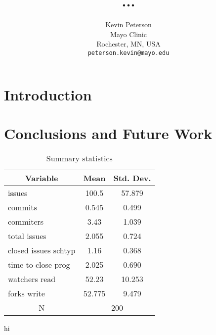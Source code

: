 \documentclass[12pt]{proc}
\title{...}
\author{Kevin Peterson\\
\small Mayo Clinic\\
\small Rochester, MN, USA\\
\small \texttt{peterson.kevin@mayo.edu}\\
}
\begin{document}
\maketitle

\begin{abstract}

\end{abstract}

\section{Introduction}


\section{Conclusions and Future Work}

\begin{table}[htbp]\centering \caption{Summary statistics \label{sumstat}}
\begin{tabular}{l c c  }\hline\hline
\multicolumn{1}{c}{\textbf{Variable}} & \textbf{Mean}
 & \textbf{Std. Dev.} \\ \hline
issues & 100.5 & 57.879  \\
commits & 0.545 & 0.499  \\
commiters & 3.43 & 1.039  \\
total issues & 2.055 & 0.724  \\
closed issues schtyp & 1.16 & 0.368  \\
time to close prog & 2.025 & 0.690  \\
watchers read & 52.23 & 10.253  \\
forks write & 52.775 & 9.479  \\
\multicolumn{1}{c}{N} & \multicolumn{2}{c}{200}\\ \hline
\end{tabular}
\end{table}



hi\cite{lakhani2003open}
\end{document}
